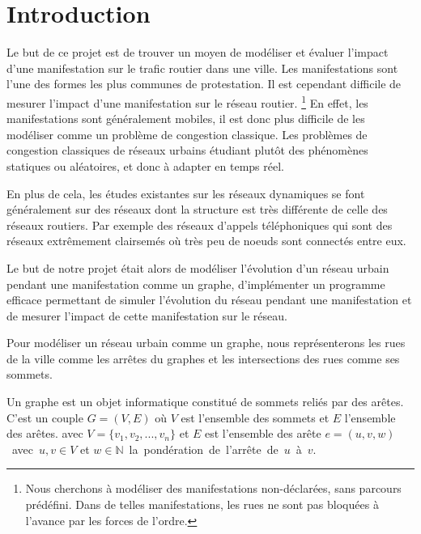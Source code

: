 \newpage
\section{Introduction}

Le but de ce projet est de trouver un moyen de modéliser et évaluer l'impact d'une manifestation 
sur le trafic routier dans une ville. Les manifestations sont l'une des formes les plus communes
de protestation. Il est cependant difficile de mesurer l'impact d'une manifestation sur le réseau routier. 
\footnote{Nous cherchons à modéliser des manifestations non-déclarées, sans parcours prédéfini. Dans
de telles manifestations, les rues ne sont pas bloquées à l'avance par les forces de l'ordre.}
En effet, les manifestations sont généralement mobiles, il est donc plus difficile de les 
modéliser comme un problème de congestion classique. Les problèmes de congestion classiques de réseaux urbains étudiant plutôt des phénomènes statiques ou aléatoires, et donc à adapter en temps réel.


En plus de cela, les études existantes sur les réseaux dynamiques se font généralement sur des réseaux 
dont la structure est très différente de celle des réseaux routiers. Par exemple des réseaux d'appels téléphoniques
qui sont des réseaux extrêmement clairsemés où très peu de noeuds sont connectés entre eux.

Le but de notre projet était alors de modéliser l'évolution d'un réseau urbain pendant une manifestation comme 
un graphe, d'implémenter un programme efficace permettant de simuler l'évolution du réseau pendant une manifestation et de mesurer l'impact de cette manifestation sur le réseau.

Pour modéliser un réseau urbain comme un graphe, nous représenterons les rues de la ville comme les arrêtes du graphes et les intersections des rues comme ses sommets.

Un graphe est un objet informatique constitué de sommets reliés par des arêtes. C'est un couple $G=(V,E)$ où $V$ est l'ensemble des sommets et $E$ l'ensemble des arêtes.
avec $V=\{v_1, v_2, ..., v_n\}$ et $E$ est l'ensemble des arête \mbox{$e = (u,v,w)$ avec $u,v \in V$} et \mbox{$w \in \mathbb{N}$ la pondération de l'arrête de $u$ à $v$}.



